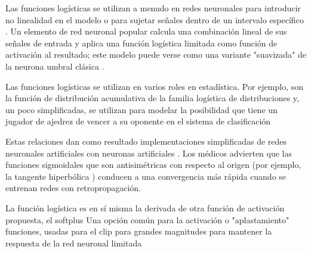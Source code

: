 Las funciones logísticas se utilizan a menudo en redes neuronales para introducir no linealidad en el modelo o para sujetar señales dentro de un intervalo específico . Un elemento de red neuronal popular calcula una combinación lineal de sus señales de entrada y aplica una función logística limitada como función de activación al resultado; este modelo puede verse como una variante "suavizada" de la neurona umbral clásica .

Las funciones logísticas se utilizan en varios roles en estadística. Por ejemplo, son la función de distribución acumulativa de la familia logística de distribuciones y, un poco simplificadas, se utilizan para modelar la posibilidad que tiene un jugador de ajedrez de vencer a su oponente en el sistema de clasificación 

Estas relaciones dan como resultado implementaciones simplificadas de redes neuronales artificiales con neuronas artificiales . Los médicos advierten que las funciones sigmoidales que son antisimétricas con respecto al origen (por ejemplo, la tangente hiperbólica ) conducen a una convergencia más rápida cuando se entrenan redes con retropropagación.

La función logística es en sí misma la derivada de otra función de activación propuesta, el softplus 
Una opción común para la activación o "aplastamiento" funciones, usadas para el clip para grandes magnitudes para mantener la respuesta de la red neuronal limitada 
